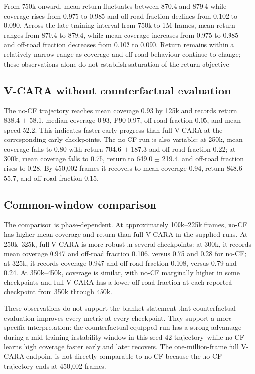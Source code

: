 \documentclass[11pt]{article}
\begin{document}
From 750k onward, mean return fluctuates between 870.4 and 879.4 while
coverage rises from 0.975 to 0.985 and off-road fraction declines from
0.102 to 0.090. Across the late-training interval from 750k to 1M frames, mean return ranges from 870.4 to 879.4, while mean coverage increases from 0.975 to 0.985 and off-road fraction decreases from 0.102 to 0.090. Return remains within a relatively narrow range as coverage and off-road behaviour continue to change; these observations alone do not establish saturation of the return objective.

\subsection{V-CARA without counterfactual
evaluation}\label{v-cara-without-counterfactual-evaluation}

The no-CF trajectory reaches mean coverage 0.93 by 125k and records
return 838.4 \(\pm\) 58.1, median coverage 0.93, P90 0.97, off-road
fraction 0.05, and mean speed 52.2. This indicates faster early progress
than full V-CARA at the corresponding early checkpoints. The no-CF run
is also variable: at 250k, mean coverage falls to 0.80 with return 704.6
\(\pm\) 187.3 and off-road fraction 0.22; at 300k, mean coverage falls
to 0.75, return to 649.0 \(\pm\) 219.4, and off-road fraction rises to
0.28. By 450,002 frames it recovers to mean coverage 0.94, return 848.6
\(\pm\) 55.7, and off-road fraction 0.15.

\subsection{Common-window comparison}\label{common-window-comparison}

The comparison is phase-dependent. At approximately 100k--225k frames,
no-CF has higher mean coverage and return than full V-CARA in the
supplied runs. At 250k--325k, full V-CARA is more robust in several
checkpoints: at 300k, it records mean coverage 0.947 and off-road
fraction 0.106, versus 0.75 and 0.28 for no-CF; at 325k, it records
coverage 0.947 and off-road fraction 0.108, versus 0.79 and 0.24. At
350k--450k, coverage is similar, with no-CF marginally higher in some
checkpoints and full V-CARA has a lower off-road fraction at each reported checkpoint from 350k through 450k.

These observations do not support the blanket statement that
counterfactual evaluation improves every metric at every checkpoint.
They support a more specific interpretation: the counterfactual-equipped
run has a strong advantage during a mid-training instability window in
this seed-42 trajectory, while no-CF learns high coverage faster early
and later recovers. The one-million-frame full V-CARA endpoint is not
directly comparable to no-CF because the no-CF trajectory ends at
450,002 frames.
\end{document}
